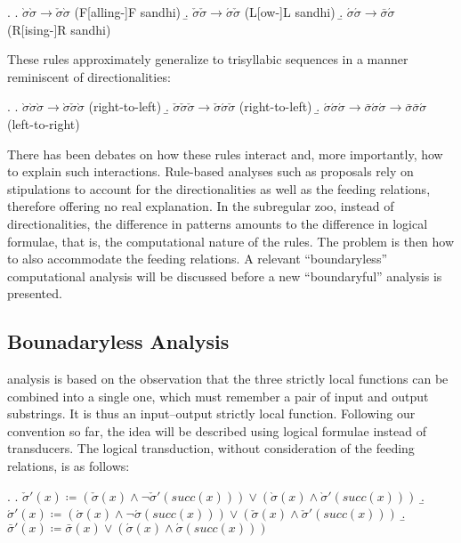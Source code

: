 \documentclass[12pt, a4paper]{report}
\begin{document}
\ex.
\a. \(\grave{\sigma}\grave{\sigma} \to \check{\sigma}\grave{\sigma}\)
\hfill(F[alling-]F sandhi)
\b. \(\check{\sigma}\check{\sigma} \to \acute{\sigma}\check{\sigma}\)
\hfill(L[ow-]L sandhi)
\b. \(\acute{\sigma}\acute{\sigma} \to \bar{\sigma}\acute{\sigma}\)
\hfill(R[ising-]R sandhi)

These rules approximately generalize to trisyllabic sequences in a
manner reminiscent of directionalities:

\ex.
\a. \(\grave{\sigma}\grave{\sigma}\grave{\sigma} \to
\grave{\sigma}\check{\sigma}\grave{\sigma}\)
\hfill(right-to-left)
\b. \(\check{\sigma}\check{\sigma}\check{\sigma} \to
\check{\sigma}\acute{\sigma}\check{\sigma}\)
\hfill(right-to-left)
\b. \(\acute{\sigma}\acute{\sigma}\acute{\sigma} \to
\bar{\sigma}\acute{\sigma}\acute{\sigma} \to
\bar{\sigma}\bar{\sigma}\acute{\sigma}\)
\hfill(left-to-right)


There has been debates on how these rules interact and, more
importantly, how to explain such interactions.  Rule-based analyses
such as  proposals rely on stipulations to
account for the directionalities as well as the feeding relations,
therefore offering no real explanation.  In the subregular zoo,
instead of directionalities, the difference in patterns amounts to the
difference in logical formulae, that is, the computational nature of
the rules.  The problem is then how to also accommodate the feeding
relations.  A relevant \enquote{boundaryless} computational analysis
will be discussed before a new \enquote{boundaryful} analysis is
presented.

\subsection{Bounadaryless Analysis}
 analysis is based on the observation that the
three strictly local functions can be combined into a single one,
which must remember a pair of input and output substrings.  It is thus
an input--output strictly local function.  Following our convention so
far, the idea will be described using logical formulae instead of
transducers.  The logical transduction, without consideration of the
feeding relations, is as follows:

\ex.
\a. \(\check{\sigma}'(x) \coloneq
(\check{\sigma}(x) \land \neg\check{\sigma}'(\mathit{succ}(x))) \lor
(\grave{\sigma}(x) \land \grave{\sigma}'(\mathit{succ}(x)))\)
\b. \(\acute{\sigma}'(x) \coloneq
(\acute{\sigma}(x) \land \neg\acute{\sigma}(\mathit{succ}(x))) \lor
(\check{\sigma}(x) \land \check{\sigma}'(\mathit{succ}(x)))\)
\b. \(\bar{\sigma}'(x) \coloneq \bar{\sigma}(x) \lor
(\acute{\sigma}(x) \land \acute{\sigma}(\mathit{succ}(x)))\)
\end{document}
